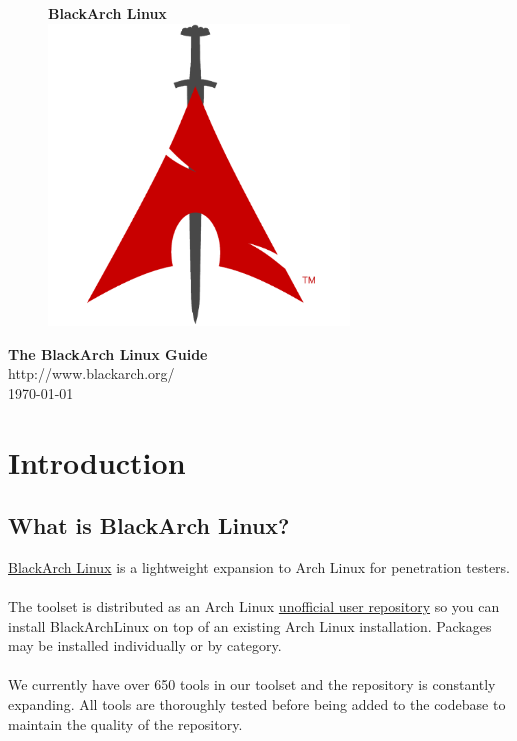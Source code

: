 \documentclass[a4paper, twoside, 11pt]{article}
\begin{document}
\pagestyle{empty}
\begin{center}
\begin{figure}[htbp]
\centering
\vspace{1cm}
\Huge{\textbf{BlackArch \color{red}Linux}}\\
\vspace{2cm}
\includegraphics[width=8cm]{logo.png}
\label{fig:logo}
\end{figure}
\vspace{1cm}
\Huge{\textbf{The BlackArch Linux Guide}}\\
\vspace{1cm}
\Large{\color{red}http://www.blackarch.org/}\\
\vspace{0.5cm}
\LARGE{\today}
\end{center}
\newpage
\tableofcontents
\newpage
\pagestyle{fancy}

\section{Introduction}

\subsection{What is BlackArch Linux?}
\href{http://www.blackarch.org}{BlackArch Linux} is a lightweight expansion to
Arch Linux for penetration testers.
\\\\
The toolset is distributed as an Arch Linux
\href{https://wiki.archlinux.org/index.php/Unofficial\_User\_Repositories}
{unofficial user repository} so you can install BlackArchLinux on top of an
existing Arch Linux installation. Packages may be installed individually or by
category.
\\\\
We currently have over 650 tools in our toolset and the repository is constantly
expanding. All tools are thoroughly tested before being added to the codebase to
maintain the quality of the repository.
\end{document}
